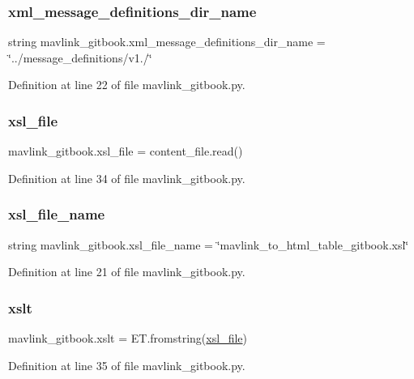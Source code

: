 \subsubsection{\texorpdfstring{xml\_message\_definitions\_dir\_name}{xml\_message\_definitions\_dir\_name}}
{\footnotesize\ttfamily string mavlink\+\_\+gitbook.\+xml\+\_\+message\+\_\+definitions\+\_\+dir\+\_\+name = \char`\"{}../message\+\_\+definitions/v1./\char`\"{}}



Definition at line 22 of file mavlink\+\_\+gitbook.\+py.

\mbox{\label{namespacemavlink__gitbook_a815a3364aa4eed144f50b92449070e4d}} 
\subsubsection{\texorpdfstring{xsl\_file}{xsl\_file}}
{\footnotesize\ttfamily mavlink\+\_\+gitbook.\+xsl\+\_\+file = content\+\_\+file.\+read()}



Definition at line 34 of file mavlink\+\_\+gitbook.\+py.

\mbox{\label{namespacemavlink__gitbook_ac6c1e2257086f4c185a1dbe339b982ee}} 
\subsubsection{\texorpdfstring{xsl\_file\_name}{xsl\_file\_name}}
{\footnotesize\ttfamily string mavlink\+\_\+gitbook.\+xsl\+\_\+file\+\_\+name = \char`\"{}mavlink\+\_\+to\+\_\+html\+\_\+table\+\_\+gitbook.\+xsl\char`\"{}}



Definition at line 21 of file mavlink\+\_\+gitbook.\+py.

\mbox{\label{namespacemavlink__gitbook_a6fdcf2e9551166072265847a9efbcc9b}} 
\subsubsection{\texorpdfstring{xslt}{xslt}}
{\footnotesize\ttfamily mavlink\+\_\+gitbook.\+xslt = E\+T.\+fromstring(\mbox{\hyperlink{namespacemavlink__gitbook_a815a3364aa4eed144f50b92449070e4d}{xsl\+\_\+file}})}



Definition at line 35 of file mavlink\+\_\+gitbook.\+py.

